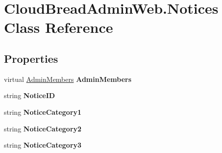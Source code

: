 \hypertarget{class_cloud_bread_admin_web_1_1_notices}{}\section{Cloud\+Bread\+Admin\+Web.\+Notices Class Reference}
\label{class_cloud_bread_admin_web_1_1_notices}
\subsection*{Properties}
\begin{DoxyCompactItemize}
\item 
virtual \hyperlink{class_cloud_bread_admin_web_1_1_admin_members}{Admin\+Members} {\bfseries Admin\+Members}\hypertarget{class_cloud_bread_admin_web_1_1_notices_a64a4c9bb292df1986b85b7c9a36f9769}{}\label{class_cloud_bread_admin_web_1_1_notices_a64a4c9bb292df1986b85b7c9a36f9769}

\item 
string {\bfseries Notice\+ID}\hypertarget{class_cloud_bread_admin_web_1_1_notices_a7ccb78d0c8fe58256fb0bac35031776d}{}\label{class_cloud_bread_admin_web_1_1_notices_a7ccb78d0c8fe58256fb0bac35031776d}

\item 
string {\bfseries Notice\+Category1}\hypertarget{class_cloud_bread_admin_web_1_1_notices_a081dd3d4d7ea9ab08e81cc1ee1d10a00}{}\label{class_cloud_bread_admin_web_1_1_notices_a081dd3d4d7ea9ab08e81cc1ee1d10a00}

\item 
string {\bfseries Notice\+Category2}\hypertarget{class_cloud_bread_admin_web_1_1_notices_ad5c8a50f4430a0965d29e778f2141360}{}\label{class_cloud_bread_admin_web_1_1_notices_ad5c8a50f4430a0965d29e778f2141360}

\item 
string {\bfseries Notice\+Category3}\hypertarget{class_cloud_bread_admin_web_1_1_notices_a54665edecf14bef7fb50415c831bc18f}{}\label{class_cloud_bread_admin_web_1_1_notices_a54665edecf14bef7fb50415c831bc18f}


\end{DoxyCompactItemize}
